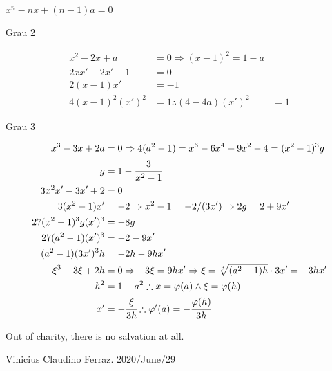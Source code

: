 \documentclass[12pt]{article}
\begin{document}
$x^n - nx + (n-1)a = 0$

Grau 2

\begin{align}
x^2 - 2x + a &= 0 \Rightarrow (x - 1)^2 = 1 - a \\
2x x' - 2 x' + 1 &= 0 \\
2(x - 1)x' &= -1 \\
4(x - 1)^2(x')^2 &= 1 \therefore (4 - 4a)(x')^2 &= 1
\end{align}

Grau 3

\begin{align}
x^3 - 3x + 2a &= 0 \Rightarrow 4(a^2 - 1) = x^6 - 6x^4 + 9x^2 - 4 = (x^2 - 1)^3 g \\
g &= 1 - \cfrac{3}{x^2 - 1} \\
3x^2 x' - 3x' + 2 &= 0 \\
3(x^2 - 1)x' &= -2 \Rightarrow x^2 - 1 = -2/(3x') \Rightarrow 2g = 2 + 9x' \\
27(x^2 - 1)^3g(x')^3 &= -8g \\
27(a^2 - 1)(x')^3 &= -2 - 9x' \\
(a^2 - 1)(3x')^3 h &= -2h - 9hx' \\
\xi^3 - 3\xi + 2h &= 0 \Rightarrow -3\xi = 9hx' \Rightarrow \xi = \sqrt[3]{(a^2-1)h} \cdot 3x' = -3hx' \\
h^2 &= 1 - a^2 \therefore x = \varphi(a) \wedge \xi = \varphi(h) \\
x' &= -\cfrac{\xi}{3h} \therefore \varphi'(a) = - \cfrac{\varphi(h)}{3h}
\end{align}

\vspace{6mm}

Out of charity, there is no salvation at all.

Vinicius Claudino Ferraz. 2020/June/29
\end{document}
